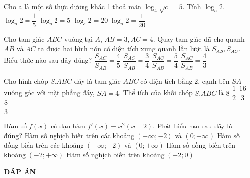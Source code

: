 \begin{ex}%
Cho a là một số thực dương khác 1 thoả mãn $\log_4\sqrt{a}=5$. Tính $\log_a2.$
\choice
{$\log_a2=\dfrac{1}{5}$}
{$\log_a2=5$}
{\True $\log_a2=20$}
{$\log_a2=\dfrac{1}{20}$}
\end{ex}
\begin{ex}%
Cho tam giác $ABC$ vuông tại $A$, $AB=3,AC=4$. Quay tam giác đã cho quanh $AB$ và $AC$ ta được hai hình nón có diện tích xung quanh lần lượt là $S_{AB},S_{AC}$. Biểu thức nào sau đây đúng?
\choice
{$\dfrac{S_{AC}}{S_{AB}}=\dfrac{4}{5}$}
{\True $\dfrac{S_{AC}}{S_{AB}}=\dfrac{3}{4}$}
{$\dfrac{S_{AC}}{S_{AB}}=\dfrac{5}{4}$}
{$\dfrac{S_{AC}}{S_{AB}}=\dfrac{4}{3}$}
\end{ex}
\begin{ex}%
Cho hình chóp $S.ABC$ đáy là tam giác $ABC$ có diện tích bằng $2$, cạnh bên $SA$ vuông góc với mặt phẳng đáy, $SA=4$. Thể tích của khối chóp $S.ABC$ là
\choice
{$8$}
{$\dfrac{1}{2}$}
{$\dfrac{16}{3}$}
{\True $\dfrac{8}{3}$}
\end{ex}
\begin{ex}%
Hàm số $f(x)$ có đạo hàm ${f}'(x)=x^2(x+2)$. Phát biểu nào sau đây là đúng?
\choice
{Hàm số nghịch biến trên các khoảng $(-\infty;-2)$ và $(0;+\infty)$}
{Hàm số đồng biến trên các khoảng $(-\infty;-2)$ và $(0;+\infty)$}
{\True Hàm số đồng biến trên khoảng $(-2;+\infty)$}
{Hàm số nghịch biến trên khoảng $(-2;0)$}
\end{ex}

\newpage
\begin{center}
	\textbf{ĐÁP ÁN}
\end{center}
\begin{multicols}{10}
	 
\end{multicols}
